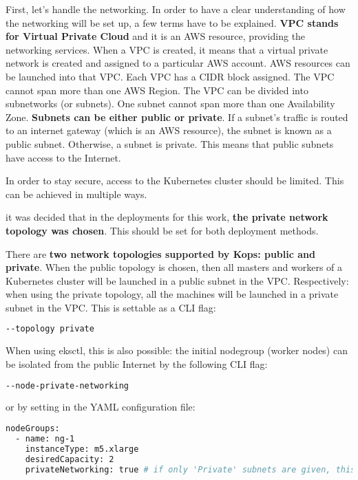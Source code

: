 First, let's handle the networking. In order to have a clear understanding of how the networking will be set up, a few terms have to be explained. \textbf{VPC stands for Virtual Private Cloud} and it is an AWS resource, providing the networking services. When a VPC is created, it means that a virtual private network is created and assigned to a particular AWS account. AWS resources can be launched into that VPC. Each VPC has a CIDR block assigned. The VPC cannot span more than one AWS Region. The VPC can be divided into subnetworks (or subnets). One subnet cannot span more than one Availability Zone. \textbf{Subnets can be either public or private}. If a subnet's traffic is routed to an internet gateway (which is an AWS resource), the subnet is known as a public subnet. Otherwise, a subnet is private\cite{aws-vpc}. This means that public subnets have access to the Internet.

In order to stay secure, access to the Kubernetes cluster should be limited. This can be achieved in multiple ways.


it was decided that in the deployments for this work, \textbf{the private network topology was chosen}. This should be set for both deployment methods.



There are \textbf{two network topologies supported by Kops: public and private}. When the public topology is chosen, then all masters and workers of a Kubernetes cluster will be launched in a public subnet in the VPC. Respectively: when using the private topology, all the machines will be launched in a private subnet in the VPC\cite{kops-net-topo}. This is settable as a CLI flag\cite{kops-net}:
\begin{lstlisting}[basicstyle=\small,caption={CLI flag used by kops to set private networking mode},captionpos=b,language=Bash,xleftmargin=1cm]
--topology private
\end{lstlisting}

When using eksctl, this is also possible: the initial nodegroup (worker nodes) can be isolated from the public Internet by the following CLI flag\cite{eksctl-net}:
\begin{lstlisting}[basicstyle=\small,caption={CLI flag used by eksctl to set private networking mode},captionpos=b,language=Bash,xleftmargin=1cm]
--node-private-networking
\end{lstlisting}
or by setting in the YAML configuration file\cite{eks-example}:
\begin{lstlisting}[basicstyle=\small,caption={YAML configuration used by Kops to set private networking mode},captionpos=b,language=Bash,xleftmargin=1cm]
nodeGroups:
  - name: ng-1
    instanceType: m5.xlarge
    desiredCapacity: 2
    privateNetworking: true # if only 'Private' subnets are given, this must be enabled
\end{lstlisting}

